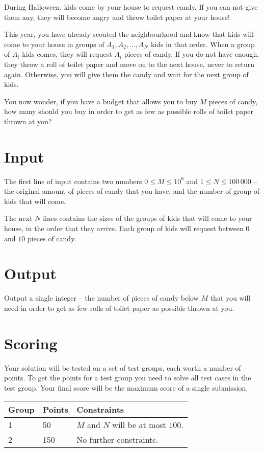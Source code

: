 During Halloween, kids come by your house to request candy.
If you can not give them any, they will become angry and throw toilet paper at your house!

This year, you have already scouted the neighbourhood and know that kids will come to your house in groups of $A_1, A_2, \dots, A_N$ kids in that order.
When a group of $A_i$ kids comes, they will request $A_i$ pieces of candy.
If you do not have enough, they throw a roll of toilet paper and move on to the next house, never to return again.
Otherwise, you will give them the candy and wait for the next group of kids.

You now wonder, if you have a budget that allows you to buy $M$ pieces of candy, how many should you buy in order to get as few as possible rolls of toilet paper thrown at you?

\section*{Input}
The first line of input contains two numbers $0 \le M \le 10^9$ and $1 \le N \le 100\,000$ -- the original amount of pieces of candy that you have, and the number of group of kids that will come.

The next $N$ lines contains the sizes of the groups of kids that will come to your house, in the order that they arrive.
Each group of kids will request between $0$ and $10$ pieces of candy.

\section*{Output}
Output a single integer -- the number of pieces of candy below $M$ that you will need in order to get as few rolls of toilet paper as possible thrown at you.

\section*{Scoring}
Your solution will be tested on a set of test groups, each worth a number of points.
To get the points for a test group you need to solve all test cases in the test group.
Your final score will be the maximum score of a single submission.

\noindent
\begin{tabular}{| l | l | l |}
\hline
Group & Points & Constraints \\ \hline
1     & 50     & $M$ and $N$ will be at most $100$. \\ \hline
2     & 150     & No further constraints. \\ \hline
\end{tabular}

